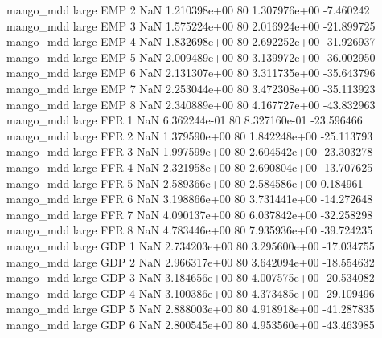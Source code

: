         mango_mdd      large      EMP                 2                  NaN 1.210398e+00 80   1.307976e+00          -7.460242
        mango_mdd      large      EMP                 3                  NaN 1.575224e+00 80   2.016924e+00         -21.899725
        mango_mdd      large      EMP                 4                  NaN 1.832698e+00 80   2.692252e+00         -31.926937
        mango_mdd      large      EMP                 5                  NaN 2.009489e+00 80   3.139972e+00         -36.002950
        mango_mdd      large      EMP                 6                  NaN 2.131307e+00 80   3.311735e+00         -35.643796
        mango_mdd      large      EMP                 7                  NaN 2.253044e+00 80   3.472308e+00         -35.113923
        mango_mdd      large      EMP                 8                  NaN 2.340889e+00 80   4.167727e+00         -43.832963
        mango_mdd      large      FFR                 1                  NaN 6.362244e-01 80   8.327160e-01         -23.596466
        mango_mdd      large      FFR                 2                  NaN 1.379590e+00 80   1.842248e+00         -25.113793
        mango_mdd      large      FFR                 3                  NaN 1.997599e+00 80   2.604542e+00         -23.303278
        mango_mdd      large      FFR                 4                  NaN 2.321958e+00 80   2.690804e+00         -13.707625
        mango_mdd      large      FFR                 5                  NaN 2.589366e+00 80   2.584586e+00           0.184961
        mango_mdd      large      FFR                 6                  NaN 3.198866e+00 80   3.731441e+00         -14.272648
        mango_mdd      large      FFR                 7                  NaN 4.090137e+00 80   6.037842e+00         -32.258298
        mango_mdd      large      FFR                 8                  NaN 4.783446e+00 80   7.935936e+00         -39.724235
        mango_mdd      large      GDP                 1                  NaN 2.734203e+00 80   3.295600e+00         -17.034755
        mango_mdd      large      GDP                 2                  NaN 2.966317e+00 80   3.642094e+00         -18.554632
        mango_mdd      large      GDP                 3                  NaN 3.184656e+00 80   4.007575e+00         -20.534082
        mango_mdd      large      GDP                 4                  NaN 3.100386e+00 80   4.373485e+00         -29.109496
        mango_mdd      large      GDP                 5                  NaN 2.888003e+00 80   4.918918e+00         -41.287835
        mango_mdd      large      GDP                 6                  NaN 2.800545e+00 80   4.953560e+00         -43.463985
